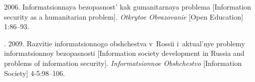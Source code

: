 
  \begin{multicols}{2}

\renewcommand{\bibname}{\protect\rmfamily References}

{\small\frenchspacing
 {%
 \begin{thebibliography}{99}
      
      
       2006. Informatsionnaya bezopasnost' kak gumanitarnaya problema 
[Information security as a humanitarian problem]. \textit{Otkrytoe Obrazovanie} [Open 
Education] 1:86--93.

      . 2009. Razvitie informatsionnogo obshchestva 
v~Rossii i~aktual'nye problemy informatsionnoy bezopasnosti [Information society 
development in Russia and problems of information security]. \textit{Informatsionnoe 
Obshchestvo} [Information Society] 4-5:98--106.


\end{thebibliography}}}
\end{multicols}
